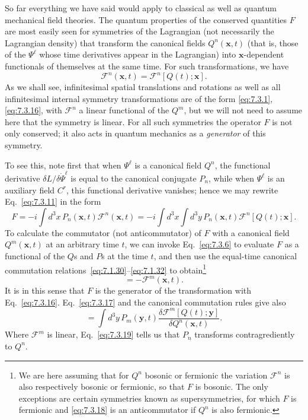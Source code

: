 So far everything we have said would apply to classical as well as quantum
mechanical field theories. The quantum properties of the conserved quantities
$F$ are most easily seen for symmetries of the Lagrangian (not necessarily the
Lagrangian density) that transform the canonical fields $Q^n(\mathbf{x},t)$
(that is, those of the $\Psi^\ell$ whose time derivatives appear in the
Lagrangian) into $\mathbf{x}$-dependent functionals of themselves at the same
time. For such transformations, we have
\begin{equation}
\mathcal{F}^n(\mathbf{x},t)=\mathcal{F}^n[Q(t);\mathbf{x}].
\tag{7.3.16}\label{eq:7.3.16}
\end{equation}
As we shall see, infinitesimal spatial translations and rotations as well as
all infinitesimal internal symmetry transformations are of the form \eqref{eq:7.3.1},
\eqref{eq:7.3.16}, with $\mathcal{F}^n$ a linear functional of the $Q^m$, but we will not
need to assume here that the symmetry is linear. For all such symmetries the
operator $F$ is not only conserved; it also acts in quantum mechanics as a
\emph{generator} of this symmetry.

To see this, note first that when $\Psi^\ell$ is a canonical field $Q^n$, the
functional derivative $\delta L/\delta\dot\Psi^\ell$ is equal to the canonical
conjugate $P_n$, while when $\Psi^\ell$ is an auxiliary field $C^r$, this
functional derivative vanishes; hence we may rewrite Eq.~\eqref{eq:7.3.11} in the form
\begin{equation}
F=-i\int d^3x\,P_n(\mathbf{x},t)\mathcal{F}^n(\mathbf{x},t)
=-i\int d^3x\int d^3y\,P_n(\mathbf{x},t)
\mathcal{F}^n[Q(t);\mathbf{x}].
\tag{7.3.17}\label{eq:7.3.17}
\end{equation}
To calculate the commutator (not anticommutator) of $F$ with a canonical field
$Q^m(\mathbf{x},t)$ at an arbitrary time $t$, we can invoke Eq.~\eqref{eq:7.3.6} to
evaluate $F$ as a functional of the $Q$s and $P$s at the time $t$, and then use
the equal-time canonical commutation relations~\eqref{eq:7.1.30}--\eqref{eq:7.1.32} to
obtain\footnote{We are here assuming that for $Q^n$ bosonic or fermionic the
variation $\mathcal{F}^n$ is also respectively bosonic or fermionic, so that
$F$ is bosonic. The only exceptions are certain symmetries known as
supersymmetries, for which $F$ is fermionic and \eqref{eq:7.3.18} is an anticommutator if
$Q^n$ is also fermionic.}
\begin{equation}
[F,Q^m(\mathbf{x},t)]=-\mathcal{F}^m(\mathbf{x},t).
\tag{7.3.18}\label{eq:7.3.18}
\end{equation}
It is in this sense that $F$ is the generator of the transformation with
Eq.~\eqref{eq:7.3.16}. Eq.~\eqref{eq:7.3.17} and the canonical commutation rules give also
\begin{equation}
[F,P_n(\mathbf{x},t)]
=\int d^3y\,P_m(\mathbf{y},t)
\frac{\delta\mathcal{F}^m[Q(t);\mathbf{y}]}
{\delta Q^n(\mathbf{x},t)}.
\tag{7.3.19}\label{eq:7.3.19}
\end{equation}
Where $\mathcal{F}^m$ is linear, Eq.~\eqref{eq:7.3.19} tells us that $P_n$ transforms
contragrediently to $Q^n$.

